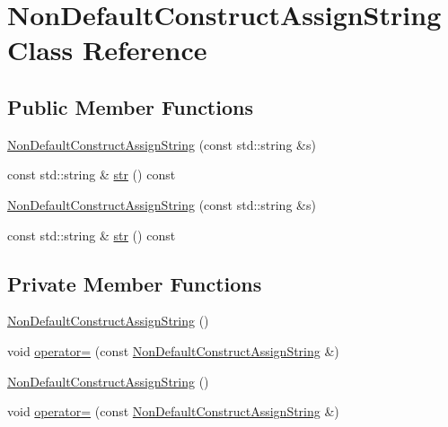 \hypertarget{class_non_default_construct_assign_string}{}\section{Non\+Default\+Construct\+Assign\+String Class Reference}
\label{class_non_default_construct_assign_string}
\subsection*{Public Member Functions}
\begin{DoxyCompactItemize}
\item 
\mbox{\hyperlink{class_non_default_construct_assign_string_a85e34ec502250fb18edd56a86353d20d}{Non\+Default\+Construct\+Assign\+String}} (const std\+::string \&s)
\item 
const std\+::string \& \mbox{\hyperlink{class_non_default_construct_assign_string_a7b428e839204101cb3b7f5b14a66688c}{str}} () const
\item 
\mbox{\hyperlink{class_non_default_construct_assign_string_a85e34ec502250fb18edd56a86353d20d}{Non\+Default\+Construct\+Assign\+String}} (const std\+::string \&s)
\item 
const std\+::string \& \mbox{\hyperlink{class_non_default_construct_assign_string_a7b428e839204101cb3b7f5b14a66688c}{str}} () const
\end{DoxyCompactItemize}
\subsection*{Private Member Functions}
\begin{DoxyCompactItemize}
\item 
\mbox{\hyperlink{class_non_default_construct_assign_string_a4665ba89efc1b36150c482340e5d9885}{Non\+Default\+Construct\+Assign\+String}} ()
\item 
void \mbox{\hyperlink{class_non_default_construct_assign_string_affc4454f81eb10342ddb98c0ff0f424d}{operator=}} (const \mbox{\hyperlink{class_non_default_construct_assign_string}{Non\+Default\+Construct\+Assign\+String}} \&)
\item 
\mbox{\hyperlink{class_non_default_construct_assign_string_a4665ba89efc1b36150c482340e5d9885}{Non\+Default\+Construct\+Assign\+String}} ()
\item 
void \mbox{\hyperlink{class_non_default_construct_assign_string_affc4454f81eb10342ddb98c0ff0f424d}{operator=}} (const \mbox{\hyperlink{class_non_default_construct_assign_string}{Non\+Default\+Construct\+Assign\+String}} \&)
\end{DoxyCompactItemize}
